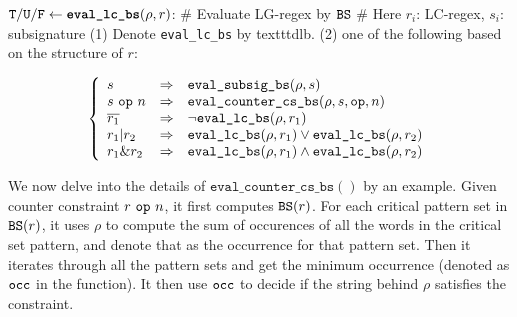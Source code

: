 \begin{small}
\begin{algorithm}[bt]
\def\dlb{\texttt{dlb}}
$\texttt{T}/\texttt{U}/\texttt{F} \leftarrow \texttt{\textbf{eval\_lc\_bs}}(\rho, r)$:  \newline
\# Evaluate LG-regex by $\texttt{BS}$ \newline
\# Here $r_i$: LC-regex, $s_i$: subsignature \newline
(1) Denote \texttt{eval\_lc\_bs} by texttt{dlb}.\newline
(2) \return one of the following based on the structure of $r$:
\begin{footnotesize}
\[
\left\{
\begin{array}{l l l}
	s & \Rightarrow & \texttt{eval\_subsig\_bs}(\rho, s) \\
	s ~\texttt{op}~ n & \Rightarrow & \texttt{eval\_counter\_cs\_bs}(\rho, s, \texttt{op}, n) \\
	\overline{r_1} &\Rightarrow & \neg \texttt{eval\_lc\_bs}(\rho,r_1) \\
	r_1 | r_2  &\Rightarrow &
			\texttt{eval\_lc\_bs}(\rho,r_1) \vee 
			\texttt{eval\_lc\_bs}(\rho,r_2)  \\
	r_1 \& r_2 & \Rightarrow &
			\texttt{eval\_lc\_bs}(\rho,r_1) \wedge 
			\texttt{eval\_lc\_bs}(\rho,r_2) 
\end{array}
\right.
\]
\end{footnotesize}
\caption{Bag of Critical Pattern Set Algorithms}
\label{fig:bw}
\end{algorithm}
\end{small}

We now delve into the details of $\texttt{eval\_counter\_cs\_bs}()$
by an example. Given counter constraint $r ~\texttt{op}~ n$, it first
computes $\texttt{BS}(r)$. For each critical pattern set in $\texttt{BS}(r)$,
it uses $\rho$ to compute the sum of occurences of all the words
in the critical set pattern, and denote that as the occurrence for
that pattern set. Then it iterates through all the pattern sets
and get the minimum occurrence (denoted as $\texttt{occ}$ in the function).
It then use $\texttt{occ}$ to decide if the string behind $\rho$ satisfies
the constraint.

